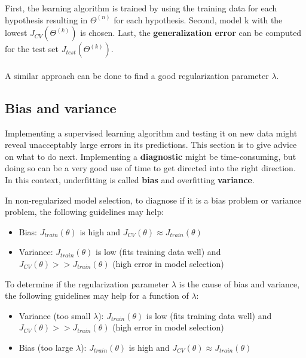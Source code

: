 \documentclass{report}
\begin{document}
First, the learning algorithm is trained by using the training data for each hypothesis resulting in $\Theta^{(n)}$ for each hypothesis. Second, model {k} with the lowest $J_{CV}(\Theta^{(k)})$ is chosen. Last, the {\bf generalization error} can be computed for the test set $J_{test}(\Theta^{(k)})$.
\\
\\
A similar approach can be done to find a good regularization parameter $\lambda$.

\subsection{Bias and variance}
\label{chapter:debugginglearning}
Implementing a supervised learning algorithm and testing it on new data might reveal unacceptably large errors in its predictions. This section is to give advice on what to do next. Implementing a {\bf diagnostic} might be time-consuming, but doing so can be a very good use of time to get directed into the right direction. In this context, underfitting is called {\bf bias} and overfitting {\bf variance}.

In non-regularized model selection, to diagnose if it is a bias problem or variance problem, the following guidelines may help:
\begin{itemize}
\item Bias: $J_{train}(\theta)$ is high and $J_{CV}(\theta)\approx J_{train}(\theta)$
\item Variance: $J_{train}(\theta)$ is low (fits training data well) and $J_{CV}(\theta)>>J_{train}(\theta)$ (high error in model selection)
\end{itemize}

To determine if the regularization parameter $\lambda$ is the cause of bias and variance, the following guidelines may help for a function of $\lambda$:
\begin{itemize}
\item Variance (too small $\lambda$): $J_{train}(\theta)$ is low (fits training data well) and $J_{CV}(\theta)>>J_{train}(\theta)$ (high error in model selection)
\item Bias (too large $\lambda$): $J_{train}(\theta)$ is high and $J_{CV}(\theta)\approx J_{train}(\theta)$
\end{itemize}
\end{document}
